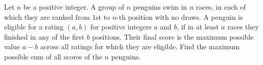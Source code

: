 Let $n$ be a positive integer.
A group of $n$ penguins swim in $n$ races,
in each of which they are ranked from $1$st to $n$-th position with no draws.
A penguin is eligible for a rating $(a,b)$ for positive integers $a$ and $b$,
if in at least $a$ races they finished in any of the first $b$ positions.
Their final score is the maximum possible value $a-b$ across all ratings for which they are eligible.
Find the maximum possible sum of all scores of the $n$ penguins.
